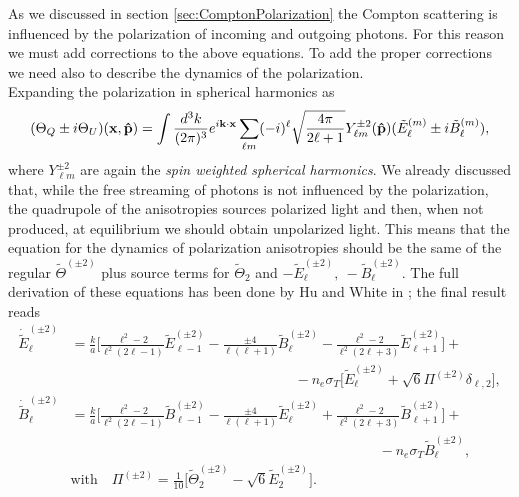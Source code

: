 As we discussed in section \ref{sec:ComptonPolarization} the Compton scattering is influenced by the polarization of incoming and outgoing photons. For this reason we must add corrections to the above equations.
To add the proper corrections we need also to describe the dynamics of the polarization.\\ Expanding the polarization in spherical harmonics as 
\begin{equation}
    (\Theta_Q\pm i\Theta_U)(\mathbf{x,\mathbf{\hat{p}}})=\int\frac{d^3k}{(2\pi)^3}e^{i\mathbf{k}\cdot\mathbf{x}}\sum_{\ell m} (-i)^{\ell}\sqrt{\frac{4\pi}{2\ell+1}}Y^{\pm2}_{\ell m}(\mathbf{\hat{p}})(\tilde E_{\ell}^{(m)}\pm i\tilde B_\ell^{(m)}) ,\label{eq:EB_multipole_expansion_tensor}
\end{equation}
where $Y^{\pm2}_{\ell m}$ are again the \emph{spin weighted spherical harmonics}. We already discussed that, while the free streaming of photons is not influenced by the polarization, the quadrupole of the anisotropies sources polarized light and then, when not produced, at equilibrium we should obtain unpolarized light. This means that the equation for the dynamics of polarization anisotropies should be the same of the regular $\tilde\Theta^{(\pm2)}$ plus source terms for $\tilde\Theta_2$ and $-\tilde E_{\ell}^{(\pm2)},\ -\tilde B_{\ell}^{(\pm2)}$. The full derivation of these equations has been done by Hu and White in \cite{HuWhite}; the final result reads
\begin{subequations}\label{eq:EB_multipole_equations_tensor}
    \begin{align}
        \dot{\tilde E}_\ell^{(\pm2)}&=\frac{k}{a}\bigg[\frac{\ell^2-2}{\ell^2(2\ell-1)}\tilde E_{\ell-1}^{(\pm2)}-\frac{\pm4}{\ell(\ell+1)}\tilde B_\ell^{(\pm2)}-\frac{\ell^2-2}{\ell^2(2\ell+3)}\tilde E_{\ell+1}^{(\pm2)}\bigg]+\nonumber\\&\qquad\qquad\qquad\qquad\qquad\qquad\qquad\qquad-n_e\sigma_T\bigg[\tilde E_{\ell}^{(\pm2)}+\sqrt{6}\Pi^{(\pm2)}\delta_{\ell,2}\bigg],\label{eq:E_multipole_equation_tensor}\\
        \dot{\tilde B}_\ell^{(\pm2)}&=\frac{k}{a}\bigg[\frac{\ell^2-2}{\ell^2(2\ell-1)}\tilde B_{\ell-1}^{(\pm2)}-\frac{\pm4}{\ell(\ell+1)}\tilde E_\ell^{(\pm2)}+\frac{\ell^2-2}{\ell^2(2\ell+3)}\tilde B_{\ell+1}^{(\pm2)}\bigg]+\nonumber\\&\qquad\qquad\qquad\qquad\qquad\qquad\qquad\qquad\qquad\qquad\qquad-n_e\sigma_T\tilde B_{\ell}^{(\pm2)},\label{eq:B_multipole_equation_tensor}\\
        \nonumber &\text{with}\quad\Pi^{(\pm2)}=\frac{1}{10}\bigg[\tilde\Theta_2^{(\pm2)}-\sqrt{6}\tilde E_2^{(\pm2)}\bigg].
    \end{align}
\end{subequations}
